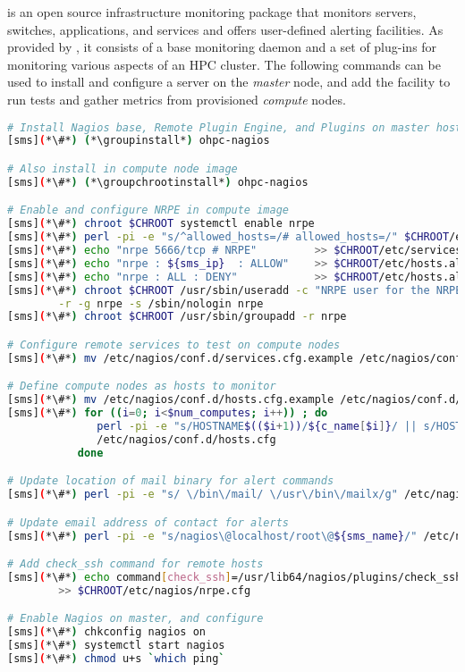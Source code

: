 \Nagios{} is an open source infrastructure monitoring package that monitors
servers, switches, applications, and services and offers user-defined alerting
facilities. As provided by \OHPC{}, it consists of a base monitoring daemon and
a set of plug-ins for monitoring various aspects of an HPC cluster. The
following commands can be used to install and configure a \Nagios{} server on the {\em
master} node, and add the facility to run tests and gather metrics from
provisioned {\em compute} nodes.

\begin{lstlisting}[language=bash,keywords={},upquote=true]
# Install Nagios base, Remote Plugin Engine, and Plugins on master host
[sms](*\#*) (*\groupinstall*) ohpc-nagios

# Also install in compute node image
[sms](*\#*) (*\groupchrootinstall*) ohpc-nagios

# Enable and configure NRPE in compute image
[sms](*\#*) chroot $CHROOT systemctl enable nrpe
[sms](*\#*) perl -pi -e "s/^allowed_hosts=/# allowed_hosts=/" $CHROOT/etc/nagios/nrpe.cfg
[sms](*\#*) echo "nrpe 5666/tcp # NRPE"         >> $CHROOT/etc/services
[sms](*\#*) echo "nrpe : ${sms_ip}  : ALLOW"    >> $CHROOT/etc/hosts.allow
[sms](*\#*) echo "nrpe : ALL : DENY"            >> $CHROOT/etc/hosts.allow
[sms](*\#*) chroot $CHROOT /usr/sbin/useradd -c "NRPE user for the NRPE service" -d /var/run/nrpe \
        -r -g nrpe -s /sbin/nologin nrpe
[sms](*\#*) chroot $CHROOT /usr/sbin/groupadd -r nrpe

# Configure remote services to test on compute nodes
[sms](*\#*) mv /etc/nagios/conf.d/services.cfg.example /etc/nagios/conf.d/services.cfg

# Define compute nodes as hosts to monitor
[sms](*\#*) mv /etc/nagios/conf.d/hosts.cfg.example /etc/nagios/conf.d/hosts.cfg
[sms](*\#*) for ((i=0; i<$num_computes; i++)) ; do
              perl -pi -e "s/HOSTNAME$(($i+1))/${c_name[$i]}/ || s/HOST$(($i+1))_IP/${c_ip[$i]}/" \
              /etc/nagios/conf.d/hosts.cfg
           done

# Update location of mail binary for alert commands
[sms](*\#*) perl -pi -e "s/ \/bin\/mail/ \/usr\/bin\/mailx/g" /etc/nagios/objects/commands.cfg

# Update email address of contact for alerts
[sms](*\#*) perl -pi -e "s/nagios\@localhost/root\@${sms_name}/" /etc/nagios/objects/contacts.cfg

# Add check_ssh command for remote hosts
[sms](*\#*) echo command[check_ssh]=/usr/lib64/nagios/plugins/check_ssh localhost \
        >> $CHROOT/etc/nagios/nrpe.cfg

# Enable Nagios on master, and configure
[sms](*\#*) chkconfig nagios on
[sms](*\#*) systemctl start nagios
[sms](*\#*) chmod u+s `which ping`
\end{lstlisting}

